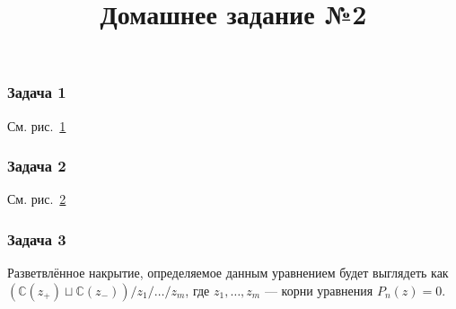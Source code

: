 \documentclass[a4paper]{article}
\title{Домашнее задание №2}
\newcommand{\prob}[1]{\subsubsection{#1}}
\begin{document}
\maketitle
\prob{Задача 1}
\begin{sol}
См. рис.~\ref{fig:1}
\begin{figure}[ht]
    \centering
    \caption{}
    \label{fig:1}
\end{figure}
\end{sol}
\prob{Задача 2}
\begin{sol}
См. рис.~\ref{fig:2}
\begin{figure}[ht]
    \centering
    \caption{}
    \label{fig:2}
\end{figure}
\end{sol}
\prob{Задача 3}
\begin{sol}
Разветвлённое накрытие, определяемое данным уравнением будет
выглядеть как $(\mathbb{C}(z_+) \sqcup \mathbb{C}(z_-))/
z_1 / \ldots /  z_m$, где $z_1,\ldots,z_m$ --- корни
уравнения $P_n(z)=0$.
\end{sol}
\end{document}
